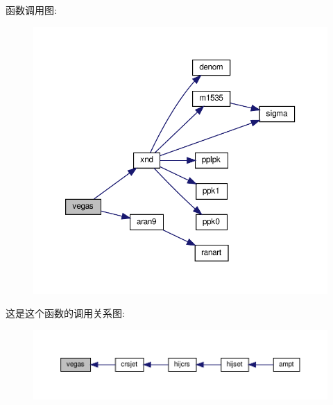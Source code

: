 函数调用图\+:
\nopagebreak
\begin{figure}[H]
\begin{center}
\leavevmode
\includegraphics[width=350pt]{vegas_8f90_acf6484cb4cfb6306e26cd7d0adef51a3_cgraph}
\end{center}
\end{figure}
这是这个函数的调用关系图\+:
\nopagebreak
\begin{figure}[H]
\begin{center}
\leavevmode
\includegraphics[width=350pt]{vegas_8f90_acf6484cb4cfb6306e26cd7d0adef51a3_icgraph}
\end{center}
\end{figure}
